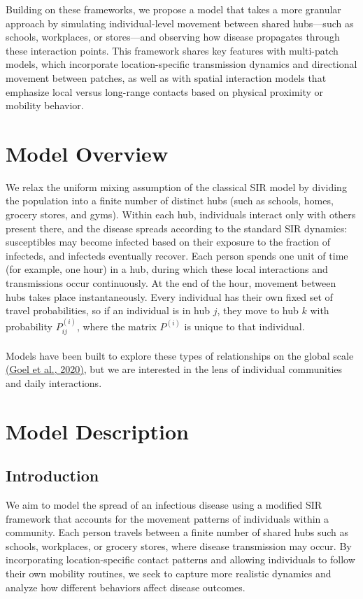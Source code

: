 \documentclass[a4paper]{article}
\begin{document}
	Building on these frameworks, we propose a model that takes a more granular approach by simulating individual-level movement between shared hubs—such as schools, workplaces, or stores—and observing how disease propagates through these interaction points. This framework shares key features with multi-patch models, which incorporate location-specific transmission dynamics and directional movement between patches, as well as with spatial interaction models that emphasize local versus long-range contacts based on physical proximity or mobility behavior.
	\section{Model Overview}
	We relax the uniform mixing assumption of the classical SIR model by dividing the population into a finite number of distinct hubs (such as schools, homes, grocery stores, and gyms). Within each hub, individuals interact only with others present there, and the disease spreads according to the standard SIR dynamics: susceptibles may become infected based on their exposure to the fraction of infecteds, and infecteds eventually recover. Each person spends one unit of time (for example, one hour) in a hub, during which these local interactions and transmissions occur continuously. At the end of the hour, movement between hubs takes place instantaneously. Every individual has their own fixed set of travel probabilities, so if an individual is in hub $j$, they move to hub $k$ with probability $P_{ij}^{(i)}$, where the matrix $P^{(i)}$ is unique to that individual.\\\\
	Models have been built to explore these types of relationships on the global scale \href{https://ieeexplore.ieee.org/document/9381457}{(Goel et al., 2020)}, but we are interested in the lens of individual communities and daily interactions.
	\section{Model Description}
	\subsection{Introduction}
	We aim to model the spread of an infectious disease using a modified SIR framework that accounts for the movement patterns of individuals within a community. Each person travels between a finite number of shared hubs such as schools, workplaces, or grocery stores, where disease transmission may occur. By incorporating location-specific contact patterns and allowing individuals to follow their own mobility routines, we seek to capture more realistic dynamics and analyze how different behaviors affect disease outcomes.
\end{document}
